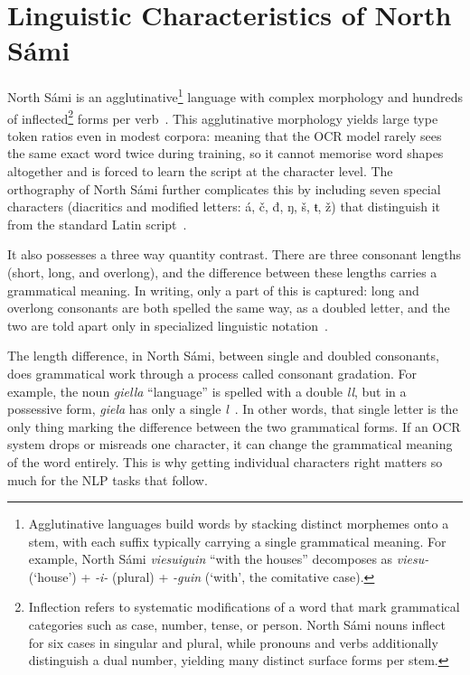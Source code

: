 \section{Linguistic Characteristics of North S\'{a}mi}

North S\'{a}mi is an
agglutinative\footnote{
Agglutinative languages build words by stacking distinct morphemes onto a stem, with each suffix typically carrying a single grammatical meaning. For example, North S\'{a}mi \textit{viesuiguin} ``with the houses'' decomposes as \textit{viesu-} (`house') + \textit{-i-} (plural) + \textit{-guin} (`with', the comitative case).}
language with complex morphology and hundreds of inflected\footnote{ Inflection refers to systematic modifications of a word that mark grammatical categories such as case, number, tense, or person. North S\'{a}mi nouns inflect for six cases in singular and plural, while pronouns and verbs additionally distinguish a dual number, yielding many distinct surface forms per stem.}
forms per verb~\cite{valijarvi2013}.
This agglutinative morphology yields large type token ratios even in modest corpora: meaning that the OCR model rarely sees the same exact word twice during training, so it cannot memorise word shapes altogether and is forced to learn the script at the character level. The orthography of North S\'{a}mi further complicates this by including seven special characters (diacritics and modified letters: \'{a}, \v{c}, đ, ŋ, \v{s}, ŧ, \v{z}) that distinguish it from the standard Latin script~\cite{valijarvi2013}.


It also possesses a three way quantity contrast. There are three consonant lengths (short, long, and overlong), and the difference between these lengths carries a grammatical meaning. In writing, only a part of this is captured: long and overlong consonants are both spelled the same way, as a doubled letter, and the two are told apart only in specialized linguistic notation~\cite{valijarvi2013}.

The length difference, in North S\'{a}mi, between single and doubled consonants, does grammatical work through a process called consonant gradation. For example, the noun \textit{giella} ``language'' is spelled with a double \textit{ll}, but in a possessive form, \textit{giela} has only a single \textit{l}~\cite{valijarvi2013}. In other words, that single letter is the only thing marking the difference between the two grammatical forms. If an OCR system drops or misreads one character, it can change the grammatical meaning of the word entirely. This is why getting individual characters right matters so much for the NLP tasks that follow.


